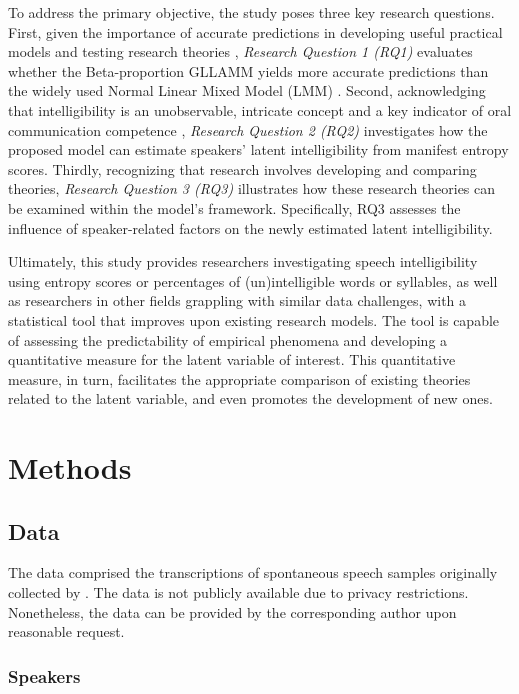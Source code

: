 \documentclass[
  authoryear,
  preprint,
  1p]{elsarticle}
\begin{document}
To address the primary objective, the study poses three key research
questions. First, given the importance of accurate predictions in
developing useful practical models and testing research theories
\citep{Shmueli_et_al_2012}, \emph{Research Question 1 (RQ1)} evaluates
whether the Beta-proportion GLLAMM yields more accurate predictions than
the widely used Normal Linear Mixed Model (LMM)
\citep{Holmes_et_al_2019}. Second, acknowledging that intelligibility is
an unobservable, intricate concept and a key indicator of oral
communication competence \citep{Kent_et_al_1994}, \emph{Research
Question 2 (RQ2)} investigates how the proposed model can estimate
speakers' latent intelligibility from manifest entropy scores. Thirdly,
recognizing that research involves developing and comparing theories,
\emph{Research Question 3 (RQ3)} illustrates how these research theories
can be examined within the model's framework. Specifically, RQ3 assesses
the influence of speaker-related factors on the newly estimated latent
intelligibility.

{Ultimately, this study provides researchers investigating speech
intelligibility using entropy scores or percentages of (un)intelligible
words or syllables, as well as researchers in other fields grappling
with similar data challenges, with a statistical tool that improves upon
existing research models. The tool is capable of assessing the
predictability of empirical phenomena and developing a quantitative
measure for the latent variable of interest. This quantitative measure,
in turn, facilitates the appropriate comparison of existing theories
related to the latent variable, and even promotes the development of new
ones.}

\section{Methods}\label{sec-methods}

\subsection{Data}\label{sec-M-D}

The data comprised the transcriptions of spontaneous speech samples
originally collected by \citet{Boonen_et_al_2021}. The data is not
publicly available due to privacy restrictions. Nonetheless, the data
can be provided by the corresponding author upon reasonable request.

\subsubsection{Speakers}\label{sec-M-S}
\end{document}
